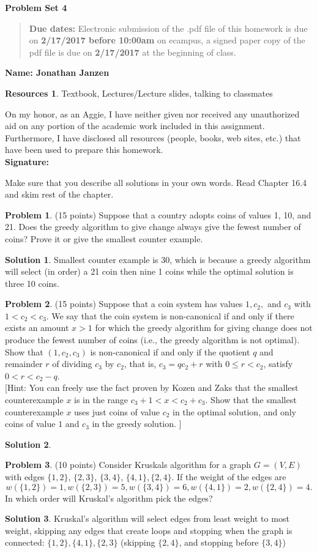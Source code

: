 \documentclass{article}
\theoremstyle{definition}
\newtheorem{problem}{Problem}
\newtheorem*{solution}{Solution}
\newtheorem*{resources}{Resources}
\newcommand{\name}[1]{\noindent\textbf{Name: #1}}
\newcommand{\honor}{\noindent On my honor, as an Aggie, I have neither
  given nor received any unauthorized aid on any portion of the
  academic work included in this assignment. Furthermore, I have
  disclosed all resources (people, books, web sites, etc.) that have
  been used to prepare this homework. \\[1ex]
 \textbf{Signature:} \underline{\hspace*{5cm}} }
\newcommand{\problemset}[1]{\begin{center}\textbf{Problem Set #1}\end{center}}
\newcommand{\duedate}[2]{\begin{quote}\textbf{Due dates:} Electronic
    submission of the .pdf file of this homework is due on \textbf{#1} on ecampus, a signed paper copy
    of the pdf file is due on \textbf{#2} at the beginning of
    class. \end{quote} }
\begin{document}
\problemset{4}
\duedate{2/17/2017 before 10:00am}{2/17/2017}
\name{Jonathan Janzen}
\begin{resources} Textbook, Lectures/Lecture slides, talking to classmates
\end{resources}
\honor

\newpage
\noindent Make sure that you describe all solutions in your own words. Read Chapter 16.4 and skim rest of the chapter. \medskip


\begin{problem} (15 points)
Suppose that a country adopts coins of values 1, 10, and 21. Does the
greedy algorithm to give change always give the fewest number of
coins?  Prove it or give the smallest counter example. 
\end{problem}
\begin{solution}
Smallest counter example is $30$, which is because a greedy algorithm will select (in order) a 21 coin then nine 1 coins while the optimal solution is three 10 coins.
\end{solution}

\begin{problem} (15 points)
Suppose that a coin system has values $1, c_2,$ and  $c_3$ with
$1<c_2<c_3$. We say that the coin system is non-canonical if and only
if there exists an amount $x>1$ for which the greedy algorithm for
giving change does not produce the fewest number of coins (i.e., the
greedy algorithm is not optimal). Show that $(1,c_2,c_3)$ is
non-canonical if and only if the quotient $q$ and remainder $r$ of
dividing $c_3$ by $c_2$, that is, 
$c_3 = qc_2+r$ with $0\le r<c_2$, 
satisfy $0< r < c_2 - q$. \\{}
[Hint: You can freely use the fact proven by Kozen and Zaks that the 
smallest counterexample $x$ is in the range $c_3+1 < x < c_2+c_3$.
Show that the smallest counterexample $x$ uses just coins of value
$c_2$ in the optimal solution, and only coins of value $1$ and $c_3$
in the greedy solution. ]
\end{problem}
\begin{solution}
\end{solution}

\begin{problem} (10 points)
Consider Kruskals algorithm for a graph $G=(V,E)$ with edges 
$\{1,2\}$, $\{2,3\}$, $\{3,4\}$, $\{4,1\}, \{2,4\}$. If the weight of the edges
are 
$$ w(\{1,2\})=1, w(\{2,3\})=5, w(\{3,4\})=6, w(\{4,1\})=2, w(\{2,4\})=4.$$
In which order will Kruskal's algorithm pick the edges? 
\end{problem}
\begin{solution}
Kruskal's algorithm will select edges from least weight to most weight, skipping any edges that create loops and stopping when the graph is connected: $\{1,2\},\{4,1\},\{2,3\}$ (skipping $\{2,4\}$, and stopping before $\{3,4\}$)
\end{solution}
\end{document}
